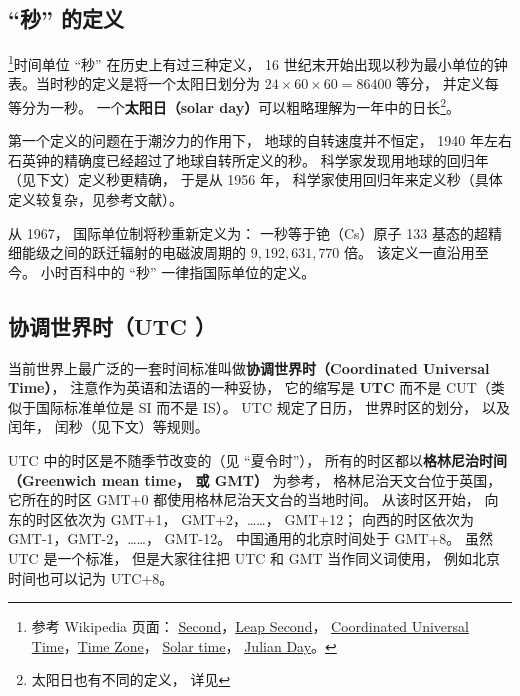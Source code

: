 
\begin{issues}
\end{issues}

\subsection{“秒” 的定义}
\footnote{参考 Wikipedia 页面： \href{https://en.wikipedia.org/wiki/Second}{Second}，\href{https://en.wikipedia.org/wiki/Leap_second}{Leap Second}， \href{https://en.wikipedia.org/wiki/Coordinated_Universal_Time}{Coordinated Universal Time}，\href{https://en.wikipedia.org/wiki/Time_zone}{Time Zone}， \href{https://en.wikipedia.org/wiki/Solar_time}{Solar time}， \href{https://en.wikipedia.org/wiki/Julian_day}{Julian Day}。}时间单位 “秒” 在历史上有过三种定义， 16 世纪末开始出现以秒为最小单位的钟表。当时秒的定义是将一个太阳日划分为 $24\times60\times60 = 86400$ 等分， 并定义每等分为一秒。 一个\textbf{太阳日（solar day）}可以粗略理解为一年中的日长\footnote{太阳日也有不同的定义， 详见}。

第一个定义的问题在于潮汐力的作用下， 地球的自转速度并不恒定， 1940 年左右石英钟的精确度已经超过了地球自转所定义的秒。 科学家发现用地球的回归年（见下文）定义秒更精确， 于是从 1956 年， 科学家使用回归年来定义秒（具体定义较复杂，见参考文献）。

从 1967， 国际单位制将秒重新定义为： 一秒等于铯（Cs）原子 133 基态的超精细能级之间的跃迁辐射的电磁波周期的 $9,192,631,770$ 倍。 该定义一直沿用至今。 小时百科中的 “秒” 一律指国际单位的定义。

\subsection{协调世界时（UTC ）}
当前世界上最广泛的一套时间标准叫做\textbf{协调世界时（Coordinated Universal Time）}， 注意作为英语和法语的一种妥协， 它的缩写是 \textbf{UTC} 而不是 CUT（类似于国际标准单位是 SI 而不是 IS）。 UTC 规定了日历， 世界时区的划分， 以及闰年， 闰秒（见下文）等规则。

UTC 中的时区是不随季节改变的（见 “夏令时”）， 所有的时区都以\textbf{格林尼治时间（Greenwich mean time， 或 GMT）} 为参考， 格林尼治天文台位于英国， 它所在的时区 GMT+0 都使用格林尼治天文台的当地时间。 从该时区开始， 向东的时区依次为 GMT+1， GMT+2，……， GMT+12； 向西的时区依次为 GMT-1，GMT-2，……， GMT-12。 中国通用的北京时间处于 GMT+8。 虽然 UTC 是一个标准， 但是大家往往把 UTC 和 GMT 当作同义词使用， 例如北京时间也可以记为 UTC+8。

